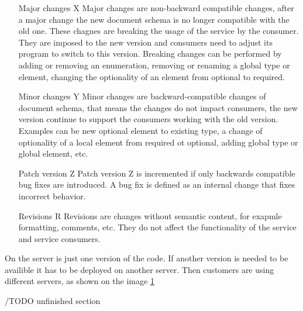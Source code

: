 \begin{enumerate}
  \item[Major changes X]
  Major changes are non-backward compatible changes, after a major change the new document schema is no longer compatible with the old one. These chagnes are breaking the usage of the service by the consumer. They are imposed to the new version and consumers need to adjust its program to switch to this version. Breaking changes can be performed by adding or removing an enumeration, removing or renaming a global type or element, changing the optionality of an element from optional to required.
    \item[Minor changes Y]
  Minor changes are backward-compatible changes of document schema, that means the changes do not impact consumers, the new version continue to support the consumers working with the old version. Examples can be new optional element to existing type, a change of optionality of a local element from required ot optional, adding global type or global element, etc.
  \item[Patch version Z]
  Patch version Z is incremented if only backwards compatible bug fixes are introduced. A bug fix is defined as an internal change that fixes incorrect behavior.
  \item[Revisions R]
  Revisions are changes without semantic content, for exapmle formatting, comments, etc. They do not affect the functionality of the service and service consumers.
\end{enumerate} 


\bigskip

On the server is just one version of the code. If another version is needed to be availible it has to be deployed on another server. Then customers are using different servers, as shown on the image \ref{fig:consumer-server}

/TODO unfinished section

\begin{figure}[htp] 
\caption{}
\label{fig:consumer-server}
\end{figure} 

